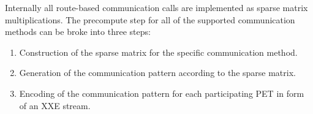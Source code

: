 

Internally all route-based communication calls are implemented as sparse matrix multiplications. The precompute step for all of the supported communication methods can be broke into three steps:
\begin{enumerate}
\item Construction of the sparse matrix for the specific communication method.
\item Generation of the communication pattern according to the sparse matrix.
\item Encoding of the communication pattern for each participating PET in form of an XXE stream.
\end{enumerate}
